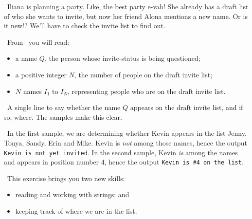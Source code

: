 

\Question\ Iliana is planning a party. Like, the best party e-vah! She already has a draft
list of who she wants to invite, but now her friend Alona mentions a new name. Or is it
new!? We'll have to check the invite list to find out.

\Input\ From \IN\ you will read:
\begin{itemize}
  \item a name $Q$, the person whose invite-status is being questioned;
  \item a positive integer $N$, the number of people on the draft invite list;
  \item $N$ names $I_1$ to $I_N$, representing people who are on the draft invite list.
\end{itemize}

\Output\ A single line to say whether the name $Q$ appears on the draft invite list, and
if so, where. The samples make this clear.

\Sample

{\small
{}
}

\Explanation\ In the first sample, we are determining whether Kevin appears in the list
Jenny, Tonya, Sandy, Erin and Mike. Kevin is \emph{not} among those names, hence the
output \texttt{Kevin is not yet invited}. In the second sample, Kevin \emph{is} among the
names and appears in position number 4, hence the output \texttt{Kevin is \#4 on the
list}.

\Scratch\ This exercise brings you two new skills:
\begin{itemize}
  \item reading and working with strings; and
  \item keeping track of where we are in the list.
\end{itemize}

